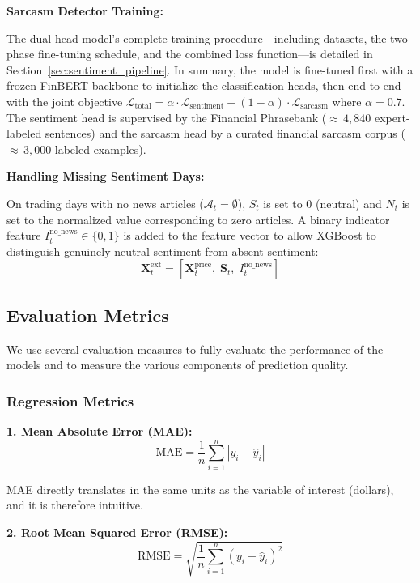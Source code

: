 \documentclass[12pt,a4paper]{article}
\begin{document}
\textbf{Sarcasm Detector Training:}

The dual-head model's complete training procedure---including datasets, the two-phase fine-tuning schedule, and the combined loss function---is detailed in Section~\ref{sec:sentiment_pipeline}. In summary, the model is fine-tuned first with a frozen FinBERT backbone to initialize the classification heads, then end-to-end with the joint objective $\mathcal{L}_{\text{total}} = \alpha \cdot \mathcal{L}_{\text{sentiment}} + (1 - \alpha) \cdot \mathcal{L}_{\text{sarcasm}}$ where $\alpha = 0.7$. The sentiment head is supervised by the Financial Phrasebank (${\approx}\,4{,}840$ expert-labeled sentences) and the sarcasm head by a curated financial sarcasm corpus (${\approx}\,3{,}000$ labeled examples).

\textbf{Handling Missing Sentiment Days:}

On trading days with no news articles ($\mathcal{A}_t = \emptyset$), $S_t$ is set to 0 (neutral) and $N_t$ is set to the normalized value corresponding to zero articles. A binary indicator feature $I_t^{\text{no\_news}} \in \{0, 1\}$ is added to the feature vector to allow XGBoost to distinguish genuinely neutral sentiment from absent sentiment:
\begin{equation}
\mathbf{X}_t^{\text{ext}} = \left[\mathbf{X}_t^{\text{price}},\; \mathbf{S}_t,\; I_t^{\text{no\_news}}\right]
\end{equation}

\subsection{Evaluation Metrics}

We use several evaluation measures to fully evaluate the performance of the models and to measure the various components of prediction quality.

\subsubsection{Regression Metrics}

\textbf{1. Mean Absolute Error (MAE):}
\begin{equation}
\text{MAE} = \frac{1}{n} \sum_{i=1}^{n} |y_i - \hat{y}_i|
\end{equation}

MAE directly translates in the same units as the variable of interest (dollars), and it is therefore intuitive.

\textbf{2. Root Mean Squared Error (RMSE):}
\begin{equation}
\text{RMSE} = \sqrt{\frac{1}{n} \sum_{i=1}^{n} (y_i - \hat{y}_i)^2}
\end{equation}
\end{document}
